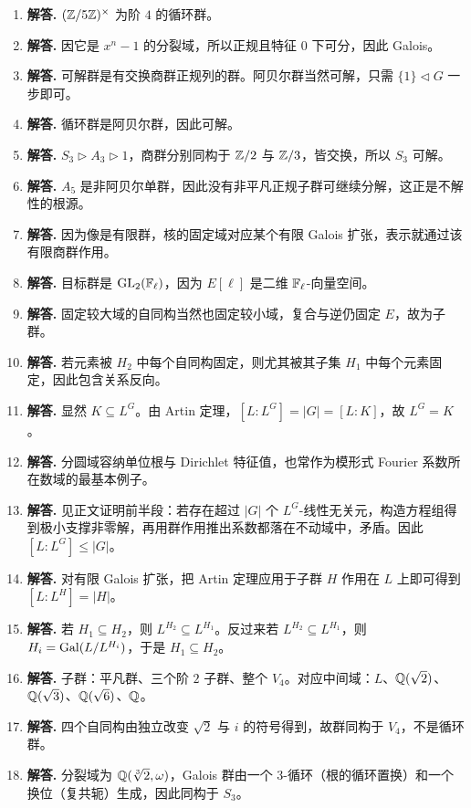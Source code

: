 \begin{enumerate}[label=\textbf{\arabic*.}, leftmargin=*, itemsep=1em]
\item \textbf{解答.} $(\mathbb{Z}/5\mathbb{Z})^\times$ 为阶 $4$ 的循环群。
\item \textbf{解答.} 因它是 $x^n-1$ 的分裂域，所以正规且特征 $0$ 下可分，因此 Galois。
\item \textbf{解答.} 可解群是有交换商群正规列的群。阿贝尔群当然可解，只需 $\{1\}\triangleleft G$ 一步即可。
\item \textbf{解答.} 循环群是阿贝尔群，因此可解。
\item \textbf{解答.} $S_3\triangleright A_3\triangleright 1$，商群分别同构于 $\mathbb{Z}/2$ 与 $\mathbb{Z}/3$，皆交换，所以 $S_3$ 可解。
\item \textbf{解答.} $A_5$ 是非阿贝尔单群，因此没有非平凡正规子群可继续分解，这正是不解性的根源。
\item \textbf{解答.} 因为像是有限群，核的固定域对应某个有限 Galois 扩张，表示就通过该有限商群作用。
\item \textbf{解答.} 目标群是 $\mathrm{GL}_2(\mathbb{F}_\ell)$，因为 $E[\ell]$ 是二维 $\mathbb{F}_\ell$-向量空间。
\item \textbf{解答.} 固定较大域的自同构当然也固定较小域，复合与逆仍固定 $E$，故为子群。
\item \textbf{解答.} 若元素被 $H_2$ 中每个自同构固定，则尤其被其子集 $H_1$ 中每个元素固定，因此包含关系反向。
\item \textbf{解答.} 显然 $K\subseteq L^G$。由 Artin 定理，$[L:L^G]=|G|=[L:K]$，故 $L^G=K$。
\item \textbf{解答.} 分圆域容纳单位根与 Dirichlet 特征值，也常作为模形式 Fourier 系数所在数域的最基本例子。
\item \textbf{解答.} 见正文证明前半段：若存在超过 $|G|$ 个 $L^G$-线性无关元，构造方程组得到极小支撑非零解，再用群作用推出系数都落在不动域中，矛盾。因此 $[L:L^G]\le|G|$。
\item \textbf{解答.} 对有限 Galois 扩张，把 Artin 定理应用于子群 $H$ 作用在 $L$ 上即可得到 $[L:L^H]=|H|$。
\item \textbf{解答.} 若 $H_1\subseteq H_2$，则 $L^{H_2}\subseteq L^{H_1}$。反过来若 $L^{H_2}\subseteq L^{H_1}$，则
$H_i=\mathrm{Gal}(L/L^{H_i})$，于是 $H_1\subseteq H_2$。
\item \textbf{解答.} 子群：平凡群、三个阶 $2$ 子群、整个 $V_4$。对应中间域：$L$、$\mathbb{Q}(\sqrt2)$、$\mathbb{Q}(\sqrt3)$、$\mathbb{Q}(\sqrt6)$、$\mathbb{Q}$。
\item \textbf{解答.} 四个自同构由独立改变 $\sqrt2$ 与 $i$ 的符号得到，故群同构于 $V_4$，不是循环群。
\item \textbf{解答.} 分裂域为 $\mathbb{Q}(\sqrt[3]{2},\omega)$，Galois 群由一个 3-循环（根的循环置换）和一个换位（复共轭）生成，因此同构于 $S_3$。

\end{enumerate}
